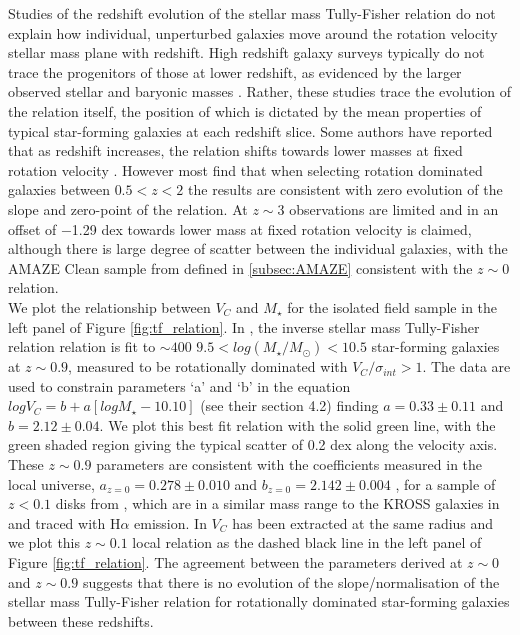 \documentclass[fleqn,usenatbib]{mn2e}
\begin{document}
Studies of the redshift evolution of the stellar mass Tully-Fisher relation do not explain how individual, unperturbed galaxies move around the rotation velocity stellar mass plane with redshift. 
High redshift galaxy surveys typically do not trace the progenitors of those at lower redshift, as evidenced by the larger observed stellar and baryonic masses \citep[e.g.][]{Cresci2009,Reyes2011,Wisnioski2015,Ubler2017}.
Rather, these studies trace the evolution of the relation itself, the position of which is dictated by the mean properties of typical star-forming galaxies at each redshift slice.
Some authors have reported that as redshift increases, the relation shifts towards lower masses at fixed rotation velocity \citep[e.g.][]{Puech2008,Cresci2009,Puech2010,Straatman2017,Ubler2017}.
However most find that when selecting rotation dominated galaxies between $0.5 < z < 2$ \citep[e.g.][]{Flores2006,Miller2011,Kassin2012,Miller2012,Vergani2012,Miller2014,Contini2015a,Molina2016,DiTeodoro2016,Simons2016,Pelliccia2017,Harrison2017} the results are consistent with zero evolution of the slope and zero-point of the relation.
At $z\sim 3$ observations are limited and in \cite{Gnerucci2011} an offset of $-$1.29 dex towards lower mass at fixed rotation velocity is claimed, although there is large degree of scatter between the individual galaxies, with the AMAZE Clean sample from \cite{Gnerucci2011} defined in \cref{subsec:AMAZE} consistent with the $z\sim0$ relation. \\

We plot the relationship between $V_{C}$ and $M_{\star}$ for the isolated field sample in the left panel of Figure \ref{fig:tf_relation}.
In \cite{Harrison2017}, the inverse stellar mass Tully-Fisher relation relation is fit to $\sim400$ $9.5 < log(M_{\star}/M_{\odot}) < 10.5$ star-forming galaxies at $z\sim0.9$, measured to be rotationally dominated with $V_{C}/\sigma_{int} > 1$.
The data are used to constrain parameters `a' and `b' in the equation $logV_{C}=b+a[logM_{\star} - 10.10]$ (see their section 4.2) finding $a = 0.33 \pm 0.11$ and $b = 2.12 \pm 0.04$.
We plot this best fit relation with the solid green line, with the green shaded region giving the typical scatter of 0.2 dex along the velocity axis.
These $z\sim0.9$ parameters are consistent with the coefficients measured in the local universe, $a_{z=0} = 0.278 \pm 0.010$ and $b_{z=0} = 2.142 \pm 0.004$ , for a sample of $z<0.1$ disks from \cite{Reyes2011}, which are in a similar mass range to the KROSS galaxies in \cite{Harrison2017} and traced with H$\alpha$ emission.
In \cite{Reyes2011} $V_{C}$ has been extracted at the same radius and we plot this $z\sim 0.1$ local relation as the dashed black line in the left panel of Figure \ref{fig:tf_relation}.
The agreement between the parameters derived at $z\sim0$ and $z\sim0.9$ suggests that there is no evolution of the slope/normalisation of the stellar mass Tully-Fisher relation for rotationally dominated star-forming galaxies between these redshifts. \\
\end{document}
